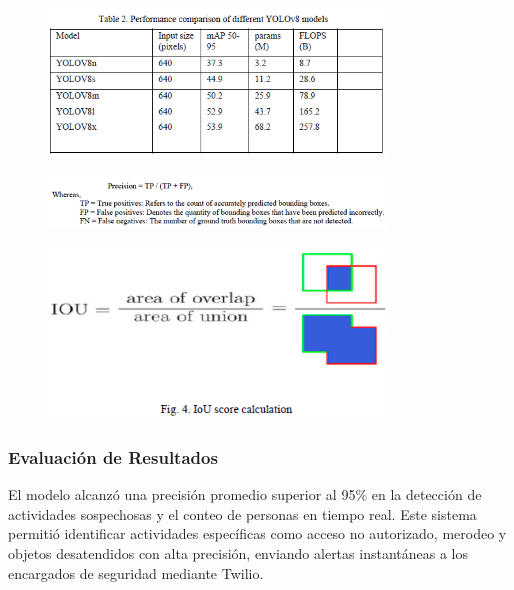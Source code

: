 \begin{figure}[h] %
    \centering
    \includegraphics[width=0.8\textwidth]{4/tab1.2.png} %
    \label{fig:ejemplo} %
\end{figure}

\begin{figure}[h] %
    \centering
    \includegraphics[width=0.8\textwidth]{4/tab1.3.png} %
    \label{fig:ejemplo} %
\end{figure}

\begin{figure}[h] %
    \centering
    \includegraphics[width=0.8\textwidth]{4/tab1.4.png} %
    \label{fig:ejemplo} %
\end{figure}

\clearpage

\subsubsection{Evaluación de Resultados}
El modelo alcanzó una precisión promedio superior al 95\% en la detección de actividades sospechosas y el conteo de personas en tiempo real. Este sistema permitió identificar actividades específicas como acceso no autorizado, merodeo y objetos desatendidos con alta precisión, enviando alertas instantáneas a los encargados de seguridad mediante Twilio.

